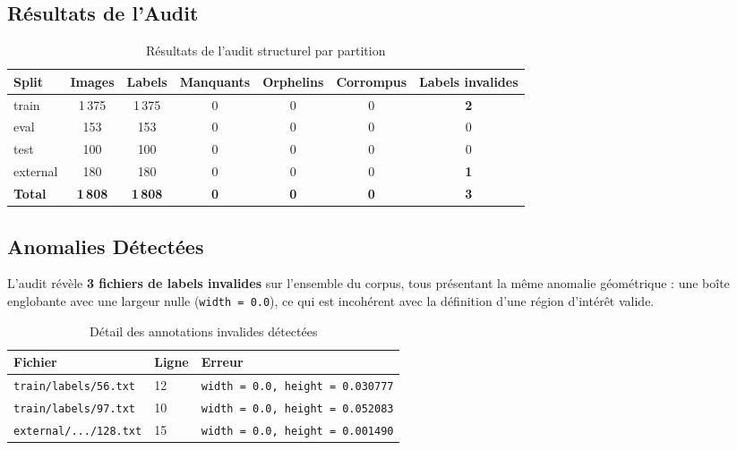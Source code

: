\documentclass{rapportENSIAS}
\begin{document}
\subsection{Résultats de l'Audit}

\begin{table}[H]
\centering
\caption{Résultats de l'audit structurel par partition}
\label{tab:audit_structurel}
\begin{tabular}{lcccccc}
\toprule
\textbf{Split} & \textbf{Images} & \textbf{Labels} & \textbf{Manquants}
               & \textbf{Orphelins} & \textbf{Corrompus} & \textbf{Labels invalides} \\
\midrule
train    & 1\,375 & 1\,375 & 0 & 0 & 0 & \textbf{2} \\
eval     & 153    & 153    & 0 & 0 & 0 & 0 \\
test     & 100    & 100    & 0 & 0 & 0 & 0 \\
external & 180    & 180    & 0 & 0 & 0 & \textbf{1} \\
\midrule
\textbf{Total} & \textbf{1\,808} & \textbf{1\,808} & \textbf{0} & \textbf{0}
               & \textbf{0} & \textbf{3} \\
\bottomrule
\end{tabular}
\end{table}

\subsection{Anomalies Détectées}

L'audit révèle \textbf{3 fichiers de labels invalides} sur l'ensemble du corpus,
tous présentant la même anomalie géométrique : une boîte englobante avec une
largeur nulle (\texttt{width = 0.0}), ce qui est incohérent avec la définition
d'une région d'intérêt valide.

\begin{table}[H]
\centering
\caption{Détail des annotations invalides détectées}
\label{tab:labels_invalides}
\begin{tabular}{llp{8cm}}
\toprule
\textbf{Fichier} & \textbf{Ligne} & \textbf{Erreur} \\
\midrule
\texttt{train/labels/56.txt}    & 12 & \texttt{width = 0.0, height = 0.030777} \\
\texttt{train/labels/97.txt}    & 10 & \texttt{width = 0.0, height = 0.052083} \\
\texttt{external/.../128.txt}  & 15 & \texttt{width = 0.0, height = 0.001490} \\
\bottomrule
\end{tabular}
\end{table}
\end{document}
